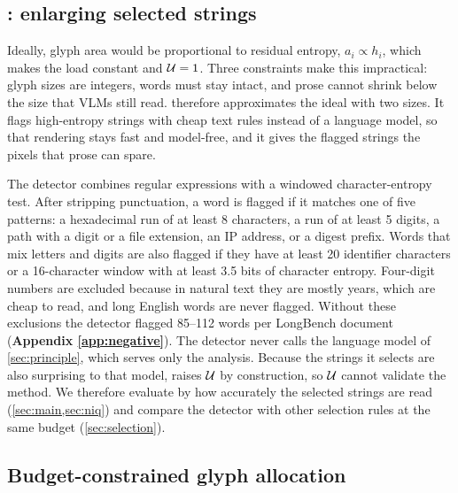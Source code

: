 \subsection{\name: enlarging selected strings}
\label{sec:detect}

Ideally, glyph area would be proportional to residual entropy, $a_i\propto h_i$, which makes the load constant and $\mathcal{U}=1$.
Three constraints make this impractical: glyph sizes are integers, words must stay intact, and prose cannot shrink below the size that VLMs still read.
\name therefore approximates the ideal with two sizes.
It flags high-entropy strings with cheap text rules instead of a language model, so that rendering stays fast and model-free, and it gives the flagged strings the pixels that prose can spare.

The detector combines regular expressions with a windowed character-entropy test.
After stripping punctuation, a word is flagged if it matches one of five patterns: a hexadecimal run of at least 8 characters, a run of at least 5 digits, a path with a digit or a file extension, an IP address, or a digest prefix.
Words that mix letters and digits are also flagged if they have at least 20 identifier characters or a 16-character window with at least 3.5 bits of character entropy.
Four-digit numbers are excluded because in natural text they are mostly years, which are cheap to read, and long English words are never flagged.
Without these exclusions the detector flagged 85--112 words per LongBench document (\textbf{Appendix \ref{app:negative}}).
The detector never calls the language model of \cref{sec:principle}, which serves only the analysis.
Because the strings it selects are also surprising to that model, \name raises $\mathcal{U}$ by construction, so $\mathcal{U}$ cannot validate the method.
We therefore evaluate \name by how accurately the selected strings are read (\cref{sec:main,sec:niq}) and compare the detector with other selection rules at the same budget (\cref{sec:selection}).

\subsection{Budget-constrained glyph allocation}
\label{sec:allocate}

